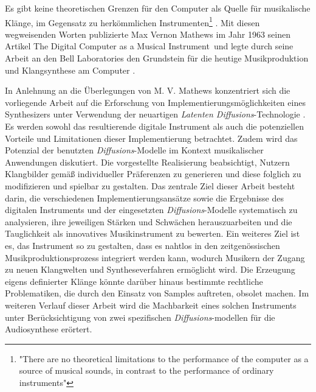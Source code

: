 \documentclass[
  a4paper,  %
  twoside,  %
  bibliography=totoc,
  headsepline,
  cleardoublepage=empty,
  parskip=half,
  draft=false
]{scrbook}
\begin{document}
\glqq Es gibt keine theoretischen Grenzen für den Computer als Quelle für musikalische Klänge, im Gegensatz zu herkömmlichen Instrumenten\grqq \footnote{"There are no theoretical limitations to the performance of the computer as a source of musical sounds, in contrast to the performance of ordinary instruments"} \cite{mathews_digital_1963}. Mit diesen wegweisenden Worten publizierte Max Vernon Mathews im Jahr 1963 seinen Artikel \glqq The Digital Computer as a Musical Instrument\grqq \, und legte durch seine Arbeit an den Bell Laboratories den Grundstein für die heutige Musikproduktion und Klangsynthese am Computer \cite{mathews_music_2004}.

In Anlehnung an die Überlegungen von M. V. Mathews konzentriert sich die vorliegende Arbeit auf die Erforschung von Implementierungsmöglichkeiten eines Synthesizers unter Verwendung der neuartigen \emph{Latenten Diffusions}-Technologie \cite{rombach_high-resolution_2022}. Es werden sowohl das resultierende digitale Instrument als auch die potenziellen Vorteile und Limitationen dieser Implementierung betrachtet. Zudem wird das Potenzial der benutzten \emph{Diffusions}-Modelle im Kontext musikalischer Anwendungen diskutiert. Die vorgestellte Realisierung beabsichtigt, Nutzern Klangbilder gemäß individueller Präferenzen zu generieren und diese folglich zu modifizieren und spielbar zu gestalten. Das zentrale Ziel dieser Arbeit besteht darin, die verschiedenen Implementierungsansätze sowie die Ergebnisse des digitalen Instruments und der eingesetzten \emph{Diffusions}-Modelle systematisch zu analysieren, ihre jeweiligen Stärken und Schwächen herauszuarbeiten und die Tauglichkeit als innovatives Musikinstrument zu bewerten. Ein weiteres Ziel ist es, das Instrument so zu gestalten, dass es nahtlos in den zeitgenössischen Musikproduktionsprozess integriert werden kann, wodurch Musikern der Zugang zu neuen Klangwelten und Syntheseverfahren ermöglicht wird. Die Erzeugung eigens definierter Klänge könnte darüber hinaus bestimmte rechtliche Problematiken, die durch den Einsatz von Samples auftreten, obsolet machen. Im weiteren Verlauf dieser Arbeit wird die Machbarkeit eines solchen Instruments unter Berücksichtigung von zwei spezifischen \emph{Diffusions}-modellen für die Audiosynthese erörtert.
\end{document}

